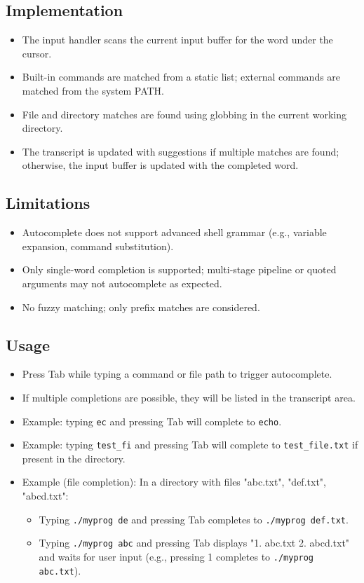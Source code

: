 \documentclass[11pt,a4paper]{article}
\begin{document}
\subsection{Implementation}
\begin{itemize}[leftmargin=*]
  \item The input handler scans the current input buffer for the word under the cursor.
  \item Built-in commands are matched from a static list; external commands are matched from the system PATH.
  \item File and directory matches are found using globbing in the current working directory.
  \item The transcript is updated with suggestions if multiple matches are found; otherwise, the input buffer is updated with the completed word.
\end{itemize}

\subsection{Limitations}
\begin{itemize}[leftmargin=*]
  \item Autocomplete does not support advanced shell grammar (e.g., variable expansion, command substitution).
  \item Only single-word completion is supported; multi-stage pipeline or quoted arguments may not autocomplete as expected.
  \item No fuzzy matching; only prefix matches are considered.
\end{itemize}

\subsection{Usage}
\begin{itemize}[leftmargin=*]
  \item Press Tab while typing a command or file path to trigger autocomplete.
  \item If multiple completions are possible, they will be listed in the transcript area.
  \item Example: typing \texttt{ec} and pressing Tab will complete to \texttt{echo}.
  \item Example: typing \texttt{test\_fi} and pressing Tab will complete to \texttt{test\_file.txt} if present in the directory.
  \item Example (file completion): In a directory with files "abc.txt", "def.txt", "abcd.txt":
    \begin{itemize}
      \item Typing \texttt{./myprog de} and pressing Tab completes to \texttt{./myprog def.txt}.
      \item Typing \texttt{./myprog abc} and pressing Tab displays "1. abc.txt 2. abcd.txt" and waits for user input (e.g., pressing 1 completes to \texttt{./myprog abc.txt}).
    \end{itemize}
\end{itemize}
\end{document}
